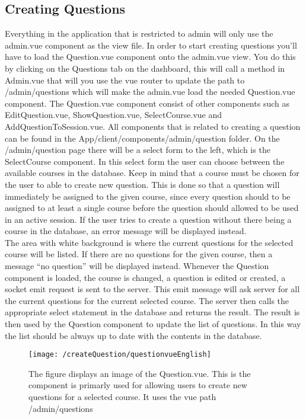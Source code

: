 \subsection{Creating Questions}
Everything in the application that is restricted to admin will only use the admin.vue component as the view file. In order to start creating questions you’ll have to load the Question.vue component onto the admin.vue view. You do this by clicking on the Questions tab on the dashboard, this will call a method in Admin.vue that will you use the vue router to update the path to /admin/questions which will make the admin.vue load the needed Question.vue component. The Question.vue component consist of other components such as EditQuestion.vue, ShowQuestion.vue, SelectCourse.vue and AddQuestionToSession.vue. All components that is related to creating a question can be found in the App/client/components/admin/question folder. On the /admin/question page there will be a select form to the left, which is the SelectCourse component. In this select form the user can choose between the available courses in the database. Keep in mind that a course must be chosen for the user to able to create new question. This is done so that a question will immediately be assigned to the given course, since every question should to be assigned to at least a single course before the question should allowed to be used in an active session.  If the user tries to create a question without there being a course in the database, an error message will be displayed instead.\\[11pt]
The area with white background is where the current questions for the selected course will be listed. If there are no questions for the given course, then a message “no question” will be displayed instead. Whenever the Question component is loaded, the course is changed, a question is edited or created, a socket emit request is sent to the server. This emit message will ask server for all the current questions for the current selected course. The server then calls the appropriate select statement in the database and returns the result. The result is then used by the Question component to update the list of questions. In this way the list should be always up to date with the contents in the database. 
\begin{figure}[H]
	\centering
	\texttt{[image: /createQuestion/questionvueEnglish]}
	\caption{The figure displays an image of the Question.vue. This is the component is primarly used for allowing users to create new questions for a selected course. It uses the vue path /admin/questions}
	\label{fig:questionVue}
\end{figure}
